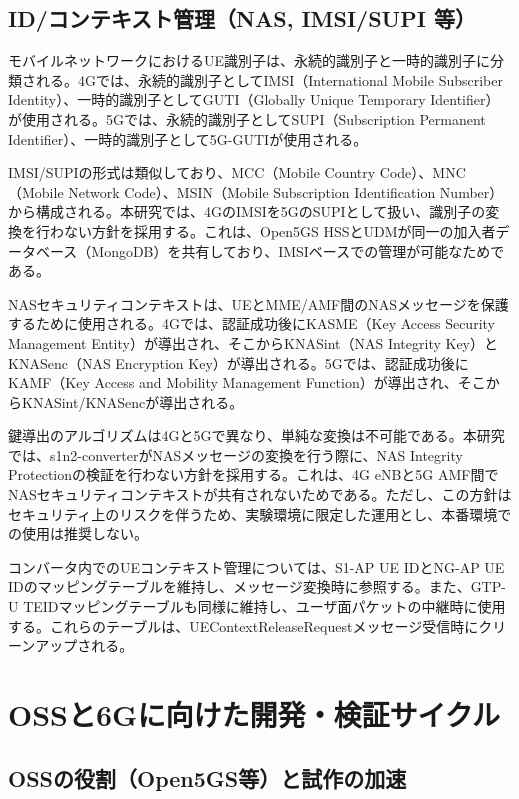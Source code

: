 \subsection{ID/コンテキスト管理（NAS, IMSI/SUPI 等）}

モバイルネットワークにおけるUE識別子は、永続的識別子と一時的識別子に分類される。4Gでは、永続的識別子としてIMSI（International Mobile Subscriber Identity）、一時的識別子としてGUTI（Globally Unique Temporary Identifier）が使用される。5Gでは、永続的識別子としてSUPI（Subscription Permanent Identifier）、一時的識別子として5G-GUTIが使用される。

IMSI/SUPIの形式は類似しており、MCC（Mobile Country Code）、MNC（Mobile Network Code）、MSIN（Mobile Subscription Identification Number）から構成される。本研究では、4GのIMSIを5GのSUPIとして扱い、識別子の変換を行わない方針を採用する。これは、Open5GS HSSとUDMが同一の加入者データベース（MongoDB）を共有しており、IMSIベースでの管理が可能なためである。

NASセキュリティコンテキストは、UEとMME/AMF間のNASメッセージを保護するために使用される。4Gでは、認証成功後にKASME（Key Access Security Management Entity）が導出され、そこからKNASint（NAS Integrity Key）とKNASenc（NAS Encryption Key）が導出される。5Gでは、認証成功後にKAMF（Key Access and Mobility Management Function）が導出され、そこからKNASint/KNASencが導出される。

鍵導出のアルゴリズムは4Gと5Gで異なり、単純な変換は不可能である。本研究では、s1n2-converterがNASメッセージの変換を行う際に、NAS Integrity Protectionの検証を行わない方針を採用する。これは、4G eNBと5G AMF間でNASセキュリティコンテキストが共有されないためである。ただし、この方針はセキュリティ上のリスクを伴うため、実験環境に限定した運用とし、本番環境での使用は推奨しない。

コンバータ内でのUEコンテキスト管理については、S1-AP UE IDとNG-AP UE IDのマッピングテーブルを維持し、メッセージ変換時に参照する。また、GTP-U TEIDマッピングテーブルも同様に維持し、ユーザ面パケットの中継時に使用する。これらのテーブルは、UEContextReleaseRequestメッセージ受信時にクリーンアップされる。

\section{OSSと6Gに向けた開発・検証サイクル}

\subsection{OSSの役割（Open5GS等）と試作の加速}


